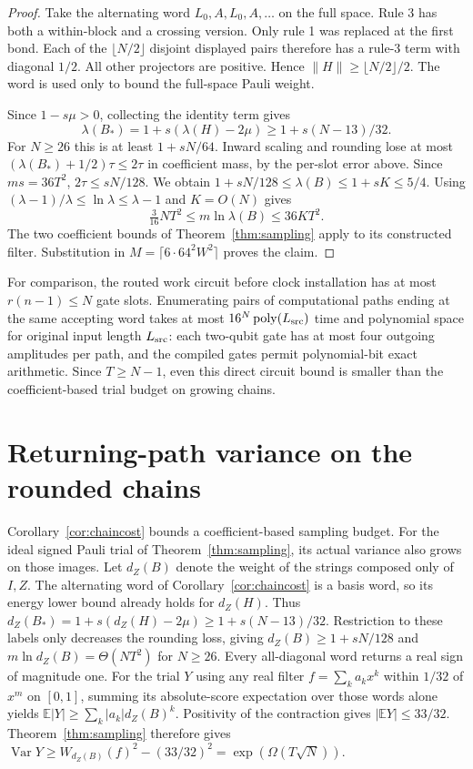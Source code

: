 \documentclass[11pt]{article}
\begin{document}
\begin{proof}
Take the alternating word \(L_0,A,L_0,A,\ldots\) on the full space. Rule 3 has both a within-block and a crossing version. Only rule 1 was replaced at the first bond. Each of the \(\lfloor N/2\rfloor\) disjoint displayed pairs therefore has a rule-3 term with diagonal \(1/2\). All other projectors are positive. Hence \(\|H\|\ge\lfloor N/2\rfloor/2\). The word is used only to bound the full-space Pauli weight.

Since \(1-s\mu>0\), collecting the identity term gives
\[
 \lambda(B_*)=1+s(\lambda(H)-2\mu)\ge1+s(N-13)/32 .
\]
For \(N\ge26\) this is at least \(1+sN/64\). Inward scaling and rounding lose at most \((\lambda(B_*)+1/2)\tau\le2\tau\) in coefficient mass, by the per-slot error above. Since \(ms=36T^2\), \(2\tau\le sN/128\). We obtain \(1+sN/128\le\lambda(B)\le1+sK\le5/4\). Using \((\lambda-1)/\lambda\le\ln\lambda\le\lambda-1\) and \(K=O(N)\) gives
\[
 \tfrac{3}{16}NT^2\le m\ln\lambda(B)\le36KT^2 .
\]
The two coefficient bounds of Theorem~\ref{thm:sampling} apply to its constructed filter. Substitution in \(M=\lceil6\cdot64^2W^2\rceil\) proves the claim.
\end{proof}
For comparison, the routed work circuit before clock installation has at most \(r(n-1)\le N\) gate slots. Enumerating pairs of computational paths ending at the same accepting word takes at most \(16^N\,\mathrm{poly}(L_{\rm src})\) time and polynomial space for original input length \(L_{\rm src}\): each two-qubit gate has at most four outgoing amplitudes per path, and the compiled gates permit polynomial-bit exact arithmetic. Since \(T\ge N-1\), even this direct circuit bound is smaller than the coefficient-based trial budget on growing chains.

\section{Returning-path variance on the rounded chains}\label{sec:variance}
Corollary~\ref{cor:chaincost} bounds a coefficient-based sampling budget. For the ideal signed Pauli trial of Theorem~\ref{thm:sampling}, its actual variance also grows on those images. Let \(d_Z(B)\) denote the weight of the strings composed only of \(I,Z\). The alternating word of Corollary~\ref{cor:chaincost} is a basis word, so its energy lower bound already holds for \(d_Z(H)\). Thus \(d_Z(B_*)=1+s(d_Z(H)-2\mu)\ge1+s(N-13)/32\). Restriction to these labels only decreases the rounding loss, giving \(d_Z(B)\ge1+sN/128\) and \(m\ln d_Z(B)=\Theta(NT^2)\) for \(N\ge26\). Every all-diagonal word returns a real sign of magnitude one. For the trial \(Y\) using any real filter \(f=\sum_k a_kx^k\) within \(1/32\) of \(x^m\) on \([0,1]\), summing its absolute-score expectation over those words alone yields \(\mathbb E|Y|\ge\sum_k|a_k|d_Z(B)^k\). Positivity of the contraction gives \(|\mathbb EY|\le33/32\). Theorem~\ref{thm:sampling} therefore gives \(\operatorname{Var}Y\ge W_{d_Z(B)}(f)^2-(33/32)^2=\exp(\Omega(T\sqrt N))\).
\end{document}
